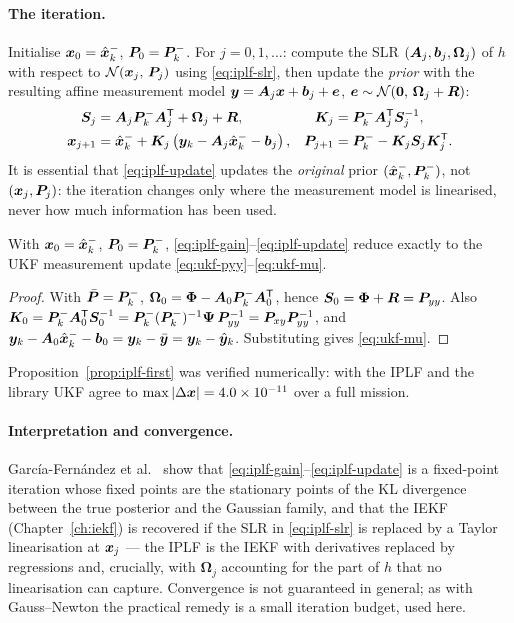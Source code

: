 \paragraph{The iteration.} Initialise $\bm{x}_0 = \hat{\bm{x}}^{-}_k$, $\bm{P}_0 = \bm{P}^{-}_k$. For
$j=0,1,\dots$: compute the SLR $(\bm{A}_j,\bm b_j,\bm\Omega_j)$ of $h$ with respect to
$\mathcal{N}\!\left(\bm{x}_j,\,\bm{P}_j\right)$ using \eqref{eq:iplf-slr}, then update the \emph{prior} with the resulting
affine measurement model $\bm{y} = \bm{A}_j\bm{x} + \bm b_j + \bm{e}$,
$\bm{e}\sim\mathcal{N}\!\left(\bm0,\,\bm\Omega_j + \bm{R}\right)$:
\begin{align}
\bm{S}_j &= \bm{A}_j\bm{P}^{-}_k\bm{A}_j^{\mathsf{T}} + \bm\Omega_j + \bm{R}, &
\bm{K}_j &= \bm{P}^{-}_k\bm{A}_j^{\mathsf{T}}\bm{S}_j^{-1}, \label{eq:iplf-gain}\\
\bm{x}_{j+1} &= \hat{\bm{x}}^{-}_k + \bm{K}_j\left(\bm{y}_k - \bm{A}_j\hat{\bm{x}}^{-}_k - \bm b_j\right), &
\bm{P}_{j+1} &= \bm{P}^{-}_k - \bm{K}_j\bm{S}_j\bm{K}_j^{\mathsf{T}}. \label{eq:iplf-update}
\end{align}
It is essential that \eqref{eq:iplf-update} updates the \emph{original} prior
$(\hat{\bm{x}}^{-}_k,\bm{P}^{-}_k)$, not $(\bm{x}_j,\bm{P}_j)$: the iteration changes only where the
measurement model is linearised, never how much information has been used.

\begin{proposition}\label{prop:iplf-first}
With $\bm{x}_0 = \hat{\bm{x}}^{-}_k$, $\bm{P}_0=\bm{P}^{-}_k$, \eqref{eq:iplf-gain}--\eqref{eq:iplf-update}
reduce exactly to the UKF measurement update \eqref{eq:ukf-pyy}--\eqref{eq:ukf-mu}.
\end{proposition}
\begin{proof}
With $\bar{\bm{P}} = \bm{P}^{-}_k$, $\bm\Omega_0 = \bm\Phi - \bm{A}_0\bm{P}^{-}_k\bm{A}_0^{\mathsf{T}}$, hence
$\bm{S}_0 = \bm\Phi + \bm{R} = \bm{P}_{yy}$. Also
$\bm{K}_0 = \bm{P}^{-}_k\bm{A}_0^{\mathsf{T}}\bm{S}_0^{-1} = \bm{P}^{-}_k(\bm{P}^{-}_k)^{-1}\bm\Psi\,\bm{P}_{yy}^{-1} =
\bm{P}_{xy}\bm{P}_{yy}^{-1}$, and
$\bm{y}_k - \bm{A}_0\hat{\bm{x}}^{-}_k-\bm b_0 = \bm{y}_k - \bar{\bm{y}} = \bm{y}_k-\hat{\bm{y}}_k$. Substituting gives
\eqref{eq:ukf-mu}.
\end{proof}
Proposition~\ref{prop:iplf-first} was verified numerically: with  the IPLF
and the library UKF agree to $\max\left\lvert \Delta\bm{x} \right\rvert = 4.0\times10^{-11}$ over a full mission.

\paragraph{Interpretation and convergence.} García-Fernández et
al.~\cite{garciafernandez2015iplf} show that \eqref{eq:iplf-gain}--\eqref{eq:iplf-update} is a
fixed-point iteration whose fixed points are the stationary points of the KL divergence
between the true posterior and the Gaussian family, and that the IEKF
(Chapter~\ref{ch:iekf}) is recovered if the SLR in \eqref{eq:iplf-slr} is replaced by a Taylor
linearisation at $\bm{x}_j$ --- the IPLF is the IEKF with derivatives replaced by regressions
and, crucially, with $\bm\Omega_j$ accounting for the part of $h$ that no linearisation can
capture. Convergence is not guaranteed in general; as with Gauss--Newton the practical
remedy is a small iteration budget, used here.

